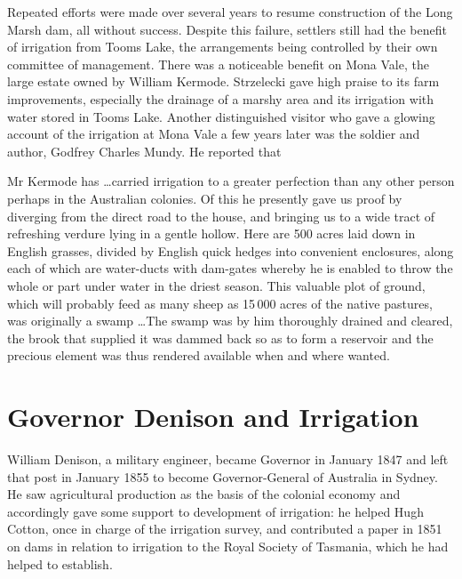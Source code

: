 Repeated efforts were made over several years to resume construction
of the Long Marsh dam,  all without success.
Despite this failure, settlers still had the benefit of irrigation
from Tooms Lake, the arrangements being controlled
by their own committee of management.  There was a noticeable benefit
on Mona Vale,
 the large estate owned by William
Kermode.   Strzelecki  gave
high praise to its farm improvements, especially the drainage of a
marshy area and its irrigation with water stored in Tooms
Lake.  Another distinguished visitor
who gave a glowing account of the irrigation at Mona Vale a few years
later was the soldier and author, Godfrey Charles Mundy.  He reported that
\begin{Quote}
	Mr Kermode has \ldots carried irrigation to a greater
	perfection than any other person perhaps in the Australian
	colonies.  Of this he presently gave us proof by diverging
	from the direct road to the house, and bringing us to a wide
	tract of refreshing verdure lying in a gentle hollow.  Here
	are 500 acres laid down in English grasses, divided by English
	quick hedges into convenient enclosures, along each of which
	are water-ducts with dam-gates where\-by he is enabled to
	throw the whole or part under water in the driest season. This
	valuable plot of ground, which will probably feed as many
	sheep as 15\,000 acres of the native pastures, was originally
	a swamp \ldots The swamp was by him thoroughly drained and
	cleared, the brook that supplied it was dammed back so as to
	form a reservoir and the precious element was thus rendered
	available when and where
	wanted.
\end{Quote}

\section*{Governor Denison and Irrigation}

William Denison, a military engineer, became Governor
 in January 1847
and left that post in January 1855 to become Governor-General of
Australia in Sydney.  He saw agricultural production as the basis of
the colonial economy and accordingly gave some support to development
of irrigation: he helped Hugh Cotton,  once in
charge of the irrigation survey, and contributed a paper in 1851 on
dams in relation to irrigation to the Royal Society of Tasmania, which
he had helped to establish.

